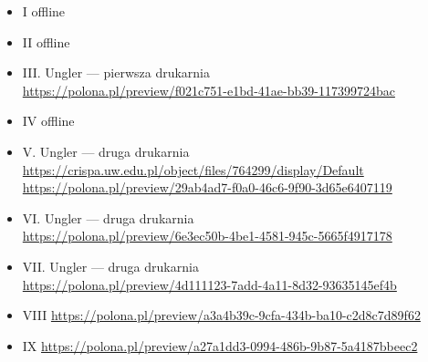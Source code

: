 \documentclass[12pt]{article}
\begin{document}
        \begin{itemize}
        \item I offline
        \item II offline
      \item III. Ungler — pierwsza drukarnia\\
        {\tiny \url{https://polona.pl/preview/f021c751-e1bd-41ae-bb39-117399724bac}}
\item IV offline
      \item V. Ungler — druga drukarnia\\[.5ex]
        {\tiny\url{https://crispa.uw.edu.pl/object/files/764299/display/Default}\\
          \url{https://polona.pl/preview/29ab4ad7-f0a0-46c6-9f90-3d65e6407119}}
      \item VI. Ungler — druga drukarnia\\
        {\url{https://polona.pl/preview/6e3ec50b-4be1-4581-945c-5665f4917178}}
      \item VII. Ungler — druga drukarnia\\
        {\url{https://polona.pl/preview/4d111123-7add-4a11-8d32-93635145ef4b}}
\item VIII \url{https://polona.pl/preview/a3a4b39c-9cfa-434b-ba10-c2d8c7d89f62}
\item IX \url{https://polona.pl/preview/a27a1dd3-0994-486b-9b87-5a4187bbeec2}

\end{itemize}
\end{document}
